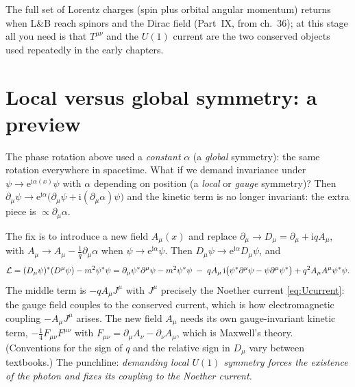 \documentclass[11pt]{article}
\begin{document}
\begin{qftbridge}
The full set of Lorentz charges (spin plus orbital angular momentum) returns when L\&B reach spinors and the Dirac field (Part~IX, from ch.~36); at this stage all you need is that $T^{\mu\nu}$ and the $U(1)$ current are the two conserved objects used repeatedly in the early chapters.
\end{qftbridge}

\section{Local versus global symmetry: a preview}

The phase rotation above used a \emph{constant} $\alpha$ (a \emph{global} symmetry): the same rotation everywhere in spacetime. What if we demand invariance under $\psi\to\mathrm e^{\mathrm i\alpha(x)}\psi$ with $\alpha$ depending on position (a \emph{local} or \emph{gauge} symmetry)? Then $\partial_\mu\psi\to\mathrm e^{\mathrm i\alpha}\big(\partial_\mu\psi+\mathrm i(\partial_\mu\alpha)\psi\big)$ and the kinetic term is no longer invariant: the extra piece is $\propto\partial_\mu\alpha$.

The fix is to introduce a new field $A_\mu(x)$ and replace $\partial_\mu\to D_\mu=\partial_\mu+\mathrm iqA_\mu$, with $A_\mu\to A_\mu-\tfrac1q\partial_\mu\alpha$ when $\psi\to\mathrm e^{\mathrm i\alpha}\psi$. Then $D_\mu\psi\to\mathrm e^{\mathrm i\alpha}D_\mu\psi$, and
\begin{equation}
  \mathcal{L}=(D_\mu\psi)^*(D^\mu\psi)-m^2\psi^*\psi=\partial_\mu\psi^*\partial^\mu\psi-m^2\psi^*\psi\;-\;qA_\mu\,\mathrm i\big(\psi^*\partial^\mu\psi-\psi\partial^\mu\psi^*\big)+q^2A_\mu A^\mu\psi^*\psi .
\end{equation}
The middle term is $-qA_\mu J^\mu$ with $J^\mu$ precisely the Noether current \eqref{eq:Ucurrent}: the gauge field couples to the conserved current, which is how electromagnetic coupling $-A_\mu J^\mu$ arises. The new field $A_\mu$ needs its own gauge-invariant kinetic term, $-\tfrac14F_{\mu\nu}F^{\mu\nu}$ with $F_{\mu\nu}=\partial_\mu A_\nu-\partial_\nu A_\mu$, which is Maxwell's theory. (Conventions for the sign of $q$ and the relative sign in $D_\mu$ vary between textbooks.) The punchline: \emph{demanding local $U(1)$ symmetry forces the existence of the photon and fixes its coupling to the Noether current.}
\end{document}
